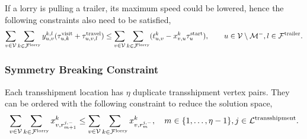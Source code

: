 If a lorry is pulling a trailer, its maximum speed could be lowered, hence the following constraints also need to be satisfied,
\begin{align}
  \label{eq:time-hard-last}
  \sum_{v \in \mathcal V} \sum_{k \in \mathcal F^{\rm lorry}} y^{k,l}_{u,v} (\tau_{u,k}^{\rm visit} + \tau_{u,v,l}^{\rm travel}) \leq \sum_{v \in \mathcal V} \sum_{k \in \mathcal F^{\rm lorry}} (t_{u,v}^k - x^k_{v,u} \tau_u^{\rm start}),
  \qquad u\in \mathcal V \setminus \mathcal M^- , l \in \mathcal F^{\rm trailer}.
\end{align}


%










\subsubsection{Symmetry Breaking Constraint}
\label{sec:symmetry}

Each transshipment location has $\eta$ duplicate transshipment vertex pairs. They can be ordered with the following constraint to reduce the solution space,
\begin{align}
  \sum_{v \in \mathcal V} 
  \sum_{k \in \mathcal F^{\rm lorry}}
  x^k_{v,r^{j,-}_{m+1}} 
  \leq 
  \sum_{v \in \mathcal V} 
  \sum_{k \in \mathcal F^{\rm lorry}}
  x^k_{v,r^{j,-}_{m}} ,
  \quad m \in \{ 1,\ldots, \eta -1 \},  j \in \mathcal L^{\rm transshipment}.
\end{align}


